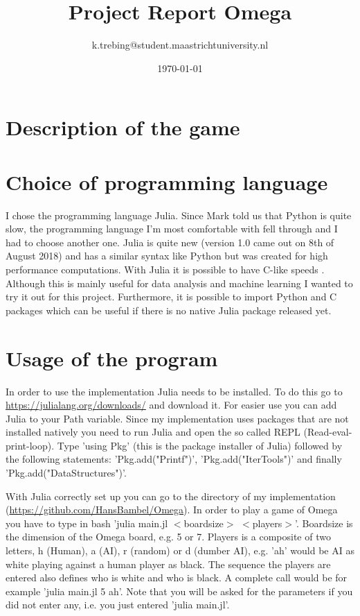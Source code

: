 \documentclass[a4paper]{article}
\title{Project Report Omega}
\author{k.trebing@student.maastrichtuniversity.nl}
\date{\today}
\begin{document}
\maketitle

\section{Description of the game}


\section{Choice of programming language}
I chose the programming language Julia. Since Mark told us that Python is quite slow, the programming language I'm most comfortable with fell through and I had to choose another one. Julia is quite new (version 1.0 came out on 8th of August 2018) \cite{julia1} and has a similar syntax like Python but was created for high performance computations. With Julia it is possible to have C-like speeds \cite{benchmarks}. Although this is mainly useful for data analysis and machine learning I wanted to try it out for this project. Furthermore, it is possible to import Python and C packages which can be useful if there is no native Julia package released yet.

\section{Usage of the program}
In order to use the implementation Julia needs to be installed. To do this go to \url{https://julialang.org/downloads/} and download it. For easier use you can add Julia to your Path variable. Since my implementation uses packages that are not installed natively you need to run Julia and open the so called REPL (Read-eval-print-loop). Type 'using Pkg' (this is the package installer of Julia) followed by the following statements: 'Pkg.add("Printf")', 'Pkg.add("IterTools")' and finally 'Pkg.add("DataStructures")'.

With Julia correctly set up you can go to the directory of my implementation (\url{https://github.com/HansBambel/Omega}). In order to play a game of Omega you have to type in bash 'julia main.jl $<$boardsize$>$ $<$players$>$'. Boardsize is the dimension of the Omega board, e.g. 5 or 7. Players is a composite of two letters, h (Human), a (AI), r (random) or d (dumber AI), e.g. 'ah' would be AI as white playing against a human player as black. The sequence the players are entered also defines who is white and who is black. A complete call would be for example 'julia main.jl 5 ah'. Note that you will be asked for the parameters if you did not enter any, i.e. you just entered 'julia main.jl'.
\end{document}
